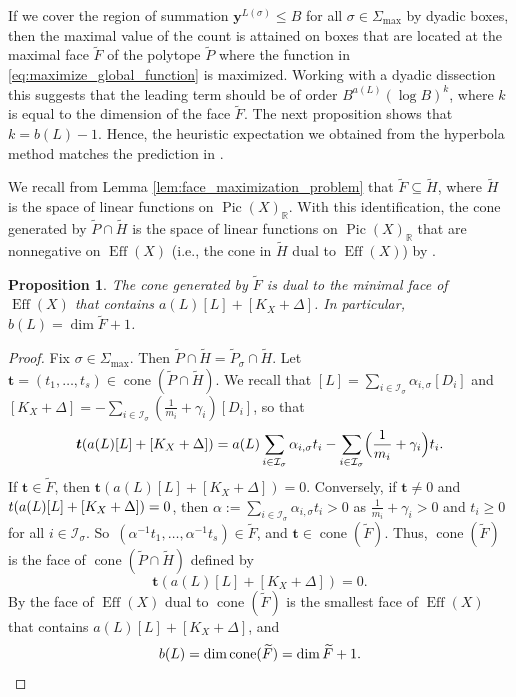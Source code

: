 \documentclass[11pt]{article}
\newcommand{\ie}{i.e.,\xspace}
\numberwithin{equation}{section}
\newcommand{\bfy}{\boldsymbol{y}}
\newcommand{\bft}{\boldsymbol{t}}
\newcommand\RR{\mathbb{R}}
\newcommand{\ic}[1]{\mathcal{I}_{#1}}
\DeclareMathOperator{\cone}{cone}
\DeclareMathOperator{\pic}{Pic}
\DeclareMathOperator{\eff}{Eff}
\newtheorem{prop}[theorem]{Proposition}
\theoremstyle{definition}
\numberwithin{theorem}{section}
\begin{document}
If we cover the region of summation $\bfy^{L(\sigma)}\leq B$ for all $\sigma\in\Sigma_{\max}$
by dyadic boxes, then the maximal value of the count is attained on boxes
that are located at the maximal face $\widetilde{F}$ of the polytope $\widetilde{P}$ where the function
in \eqref{eq:maximize_global_function} is maximized.
Working with a dyadic dissection this suggests that the leading term should be
of order $B^{a(L)} (\log B)^k$, where $k$ is equal to the dimension of the face $\widetilde{F}$.
The next proposition shows that $k=b(L)-1$.
Hence, the heuristic expectation we obtained from the hyperbola method matches
the prediction in \cite[Conj.\,1.1]{PSTVA}.

We recall from Lemma \ref{lem:face_maximization_problem} that
$\widetilde F\subseteq\widetilde H$, where $\widetilde H$
is the space of linear functions on $\pic(X)_\RR$.
With this identification, the cone generated by $\widetilde P\cap \widetilde H$ is the space
of linear functions on $\pic(X)_{\RR}$ that are nonnegative on $\eff(X)$
(\ie the cone in $\widetilde H$ dual to $\eff(X)$) by \cite[Prop.\,1.2.8]{MR2810322}.

\begin{prop}
\label{prop:description_b}
The cone generated by $\widetilde F$ is dual to the minimal face of $\eff(X)$ that contains
$a(L)[L]+[K_X+\Delta]$. In particular, $b(L)= \dim \widetilde F+1$.
\end{prop}
\begin{proof}
Fix $\sigma\in\Sigma_{\max}$.
Then $\widetilde P\cap \widetilde H=\widetilde P_\sigma\cap \widetilde H$.
Let $\bft=(t_1,\dots,t_s)\in \cone(\widetilde P\cap \widetilde H)$.
We recall that $[L] = \sum_{i\in\ic{\sigma}} \alpha_{i,\sigma} [D_{i}]$ and
$[K_X+\Delta] = -\sum_{i\in\ic{\sigma}}(\frac 1{m_i} + \gamma_i)[D_{i}]$, so that
\[
\bft(a(L)[L] + [K_X+\Delta])
= a(L) \sum_{i\in\ic{\sigma}}\alpha_{i,\sigma} t_i
- \sum_{i\in\ic{\sigma}} \Bigl(\frac 1{m_i} + \gamma_i \Bigr) t_i.
\]
If $\bft\in \widetilde F$, then $\bft (a(L)[L] + [K_X+\Delta]) =0$.
Conversely, if $\bft\neq0$ and $t (a(L)[L] + [K_X+\nobreak\Delta]) =0$,
then $\alpha:=\sum_{i\in\ic{\sigma}}\alpha_{i,\sigma} t_i > 0$ as $\frac 1{m_i} + \gamma_i>0$
and $t_i\geq0$ for all $i\in\ic{\sigma}$.
So~$(\alpha^{-1}t_1,\dots,\alpha^{-1}t_s)\in \widetilde F$, and $\bft\in \cone(\widetilde F)$.
Thus, $\cone(\widetilde F)$ is the face of $\cone(\widetilde P\cap \widetilde H)$ defined by
\[
\bft(a(L)[L] + [K_X+\Delta]) =0.
\]
By \cite[Def.\,1.2.5, Prop.\,1.2.10]{MR2810322} the face of
$\eff(X)$ dual to $\cone(\widetilde F)$ is
the smallest face of $\eff(X)$ that contains $a(L)[L] + [K_X+\Delta]$, and
\begin{equation*}b(L)=\dim \cone(\widetilde F) = \dim \widetilde F+1.\qedhere\end{equation*}
\end{proof}
\end{document}
